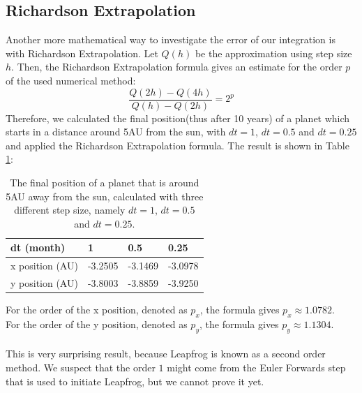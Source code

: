 \subsection{Richardson Extrapolation}
Another more mathematical way to investigate the error of our integration is with Richardson Extrapolation. Let $Q(h)$ be the approximation using step size $h$. Then, the Richardson Extrapolation formula \cite{Richardson} gives an estimate for the order $p$ of the used numerical method:
\[\frac{Q(2h)-Q(4h)}{Q(h)-Q(2h)}=2^p\]
Therefore, we calculated the final position(thus after 10 years) of a planet which starts in a distance around 5AU from the sun, with $dt=1$, $dt=0.5$ and $dt=0.25$ and applied the Richardson Extrapolation formula. The result is shown in Table \ref{tab:Richardson5AU}:
\begin{table}[htb]
\centering
\caption{The final position of a planet that is around 5AU away from the sun, calculated with three different step size, namely $dt=1$, $dt=0.5$ and $dt=0.25$.}
\begin{tabular}{|l|l|l|l|}
\hline
dt (month)&1&0.5&0.25\\ \hline
x position (AU)&-3.2505&   -3.1469&   -3.0978\\ \hline
y position (AU)&   -3.8003&   -3.8859&   -3.9250\\ \hline
\end{tabular}
\label{tab:Richardson5AU}
\end{table}
\newline
For the order of the x position, denoted as $p_x$, the formula gives $p_x\approx 1.0782$.\\
For the order of the y position, denoted as $p_y$, the formula gives $p_y\approx 1.1304$.\\ 
\\
This is very surprising result, because Leapfrog is known as a second order method. We suspect that the order $1$ might come from the Euler Forwards step that is used to initiate Leapfrog, but we cannot prove it yet.